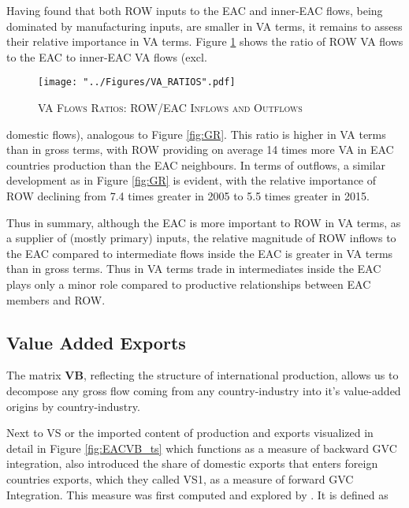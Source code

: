 \documentclass[a4paper]{article}
\begin{document}
Having found that both ROW inputs to the EAC and inner-EAC flows, being dominated by manufacturing inputs, are smaller in VA terms, it remains to assess their relative importance in VA terms.  Figure \ref{fig:VAR} shows the ratio of ROW VA flows to the EAC to inner-EAC VA flows (excl.

\begin{figure}[h!] \vspace{-2mm}
\centering
\caption{\label{fig:VAR}\textsc{VA Flows Ratios: ROW/EAC Inflows and Outflows}}
\texttt{[image: "../Figures/VA\_RATIOS".pdf]} %
\vspace{-15mm}
\end{figure}
\FloatBarrier

\noindent domestic flows), analogous to Figure \ref{fig:GR}.  This ratio is higher in VA terms than in gross terms, with ROW providing on average 14 times more VA in EAC countries production than the EAC neighbours. In terms of outflows, a similar development as in Figure \ref{fig:GR} is evident, with the relative importance of ROW declining from 7.4 times greater in 2005 to 5.5 times greater in 2015.  \newline

Thus in summary, although the EAC is more important to ROW in VA terms, as a supplier of (mostly primary) inputs, the relative magnitude of ROW inflows to the EAC compared to intermediate flows inside the EAC is greater in VA terms than in gross terms. Thus in VA terms trade in intermediates inside the EAC plays only a minor role compared to productive relationships between EAC members and ROW. 



\subsection{Value Added Exports}

The matrix \textbf{VB}, reflecting the structure of international production, allows us to decompose any gross flow coming from any country-industry into it's value-added origins by country-industry. 

Next to VS or the imported content of production and exports visualized in detail in Figure \ref{fig:EACVB_ts} which functions as a measure of backward GVC integration, \citet{hummels2001nature} also introduced the share of domestic exports that enters foreign countries exports, which they called VS1, as a measure of forward GVC Integration. This measure was first computed and explored by \citet{daudin2011produces}. It is defined as 
\end{document}

